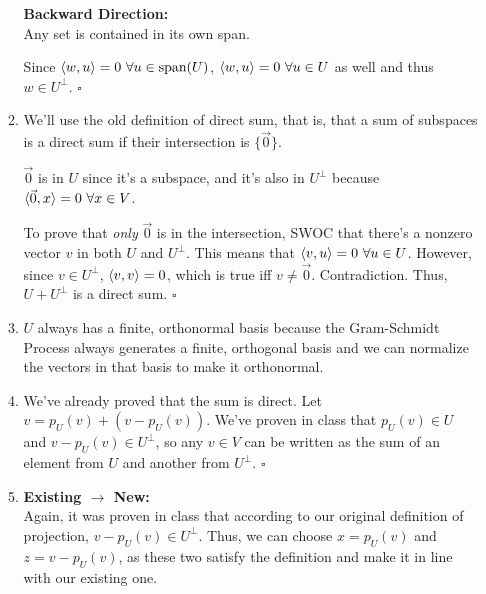 \documentclass[12pt]{article}
\begin{document}
\begin{enumerate}
\begin{enumerate}
                        \textbf{Backward Direction:} \\
                        Any set is contained in its own span.

                        Since $\braket{w, u}=0\ \forall u \in \text{span}(U)$,
                        $\braket{w, u}=0\ \forall u \in U$ as well and thus $w \in U^\perp$. $\square$
                  \item We'll use the old definition of direct sum, that is,
                        that a sum of subspaces is a direct sum if their intersection is $\{\vec{0}\}$.

                        $\vec{0}$ is in $U$ since it's a subspace, and it's also
                        in $U^\perp$ because $\braket{\vec{0}, x}=0\ \forall x \in V$.

                        To prove that \textit{only} $\vec{0}$ is in the intersection,
                        SWOC that there's a nonzero vector $v$ in both $U$ and $U^\perp$.
                        This means that $\braket{v, u}=0\ \forall u \in U$.
                        However, since $v \in U^\perp$, $\braket{v, v}=0$, which is true iff $v \ne \vec{0}$.
                        Contradiction.
                        Thus, $U+U^\perp$ is a direct sum. $\square$ \label{list:7b}

                  \item $U$ always has a finite, orthonormal basis because
                        the Gram-Schmidt Process always generates a finite, orthogonal basis
                        and we can normalize the vectors in that basis to make it orthonormal.

                  \item We've already proved that the sum is direct.
                        Let $v=p_U(v)+(v-p_U(v))$.
                        We've proven in class that $p_U(v) \in U$ and $v-p_U(v) \in U^\perp$,
                        so any $v \in V$ can be written as the sum of an
                        element from $U$ and another from $U^\perp$. $\square$

                  \item \textbf{Existing $\rightarrow$ New:} \\
                        Again, it was proven in class that according to our original
                        definition of projection, $v-p_U(v) \in U^\perp$.
                        Thus, we can choose $x=p_U(v)$ and $z=v-p_U(v)$,
                        as these two satisfy the definition and make it in line
                        with our existing one.


\end{enumerate}
\end{enumerate}
\end{document}
